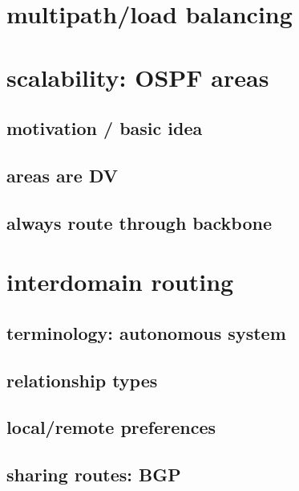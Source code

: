 \section{multipath/load balancing}


\section{scalability: OSPF areas} %

\subsection{motivation / basic idea}



\subsection{areas are DV}



\subsection{always route through backbone}


\section{interdomain routing}


\subsection{terminology: autonomous system}


\subsection{relationship types}


\subsection{local/remote preferences}


\subsection{sharing routes: BGP}


